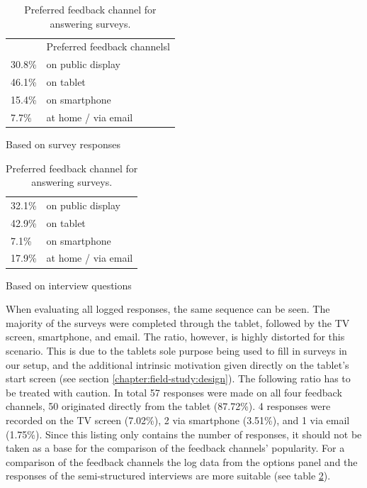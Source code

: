 	\begin{table}[h]



	\parbox{.45\linewidth}{
		\centering
	    \begin{tabular}{ll}
	    \toprule
	    & Preferred feedback channelsl     \\
	    30.8\%       & on public display     \\
	    46.1\%       & on tablet         \\
	    15.4\%       &  on smartphone          \\
	    7.7\%        &  at home / via email        \\
	    \bottomrule
	    \end{tabular}   
		\caption{Based on survey responses}
	}
	\hfill
	\parbox{.45\linewidth}{
		\centering
	    \begin{tabular}{ll}
	    \toprule
	    32.1\%       & on public display     \\
	    42.9\%       & on tablet         \\
	    7.1\%       &  on smartphone          \\
	    17.9\%        &  at home / via email        \\
	    \bottomrule
	    \end{tabular} 
   		\caption{Based on interview questions}
	}


		\caption[Feedback Channel]{Preferred feedback channel for answering surveys.}
		\label{table:5-feedback-channel}
	\end{table}


	When evaluating all logged responses, the same sequence can be seen. The majority of the surveys were completed through the tablet, followed by the TV screen, smartphone, and email. The ratio, however, is highly distorted for this scenario. This is due to the tablets sole purpose being used to fill in surveys in our setup, and the additional intrinsic motivation given directly on the tablet's start screen (see section \ref{chapter:field-study:design}). The following ratio has to be treated with caution. In total 57 responses were made on all four feedback channels, 50 originated directly from the tablet (87.72\%). 4 responses were recorded on the TV screen (7.02\%), 2 via smartphone (3.51\%), and 1 via email (1.75\%). Since this listing only contains the number of responses, it should not be taken as a base for the comparison of the feedback channels' popularity. %
	For a comparison of the feedback channels the log data from the options panel and the responses of the semi-structured interviews are more suitable (see table \ref{table:5-feedback-channel}).




